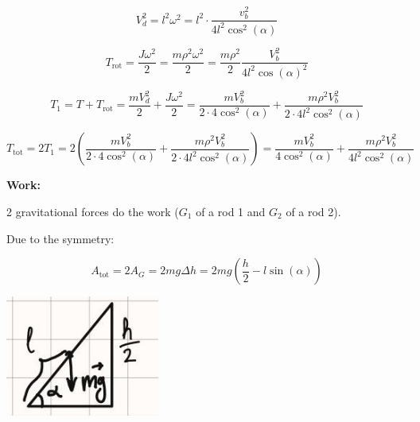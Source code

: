 \documentclass{article}
\begin{document}
\[V_d^2 = l^2 \omega^2 = l^2 \cdot \frac{v_b^2}{4l^2 \cos^2(\alpha)}\]

\[T_\text{rot} = \dfrac{J \omega^2}{2} = \dfrac{m \rho^2 \omega^2}{2} = \dfrac{m \rho^2}{2} \dfrac{V_b^2}{4l^2 \cos(\alpha)^2}\]

\[T_1 = T + T_{\text{rot}} = \frac{mV_d^2}{2} + \frac{J \omega^2}{2} = \frac{m V_b^2}{2 \cdot 4 \cos^2(\alpha)} + \frac{m \rho^2 V_b^2}{2 \cdot 4l^2 \cos^2(\alpha)}\]

\[T_\text{tot} = 2T_1 = 2 (\frac{m V_b^2}{2 \cdot 4 \cos^2(\alpha)} + \frac{m \rho^2 V_b^2}{2 \cdot 4l^2 \cos^2(\alpha)}) = \frac{m V_b^2}{4 \cos^2(\alpha)} + \frac{m \rho^2 V_b^2}{4l^2 \cos^2(\alpha)}\]

\textbf{Work:}

2 gravitational forces do the work ($G_1$ of a rod 1 and $G_2$ of a rod 2).

Due to the symmetry:

\[A_\text{tot} = 2A_G = 2 mg \Delta h = 2mg ( \frac{h}{2} - l \sin(\alpha))\]
 
\begin{center}
  \includegraphics[scale=0.35]{task_scheme/task1_scheme.png}
\end{center}
\end{document}
